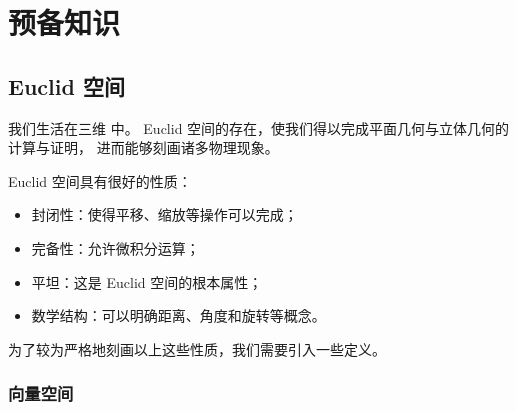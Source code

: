 \chapter{预备知识}

\section{Euclid 空间}

我们生活在三维 中。
Euclid 空间的存在，使我们得以完成平面几何与立体几何的计算与证明，
进而能够刻画诸多物理现象。

Euclid 空间具有很好的性质：
\begin{itemize}
  \item 封闭性：使得平移、缩放等操作可以完成；
  \item 完备性：允许微积分运算；
  \item 平坦：这是 Euclid 空间的根本属性；
  \item 数学结构：可以明确距离、角度和旋转等概念。
\end{itemize}

为了较为严格地刻画以上这些性质，我们需要引入一些定义。

\subsection{向量空间}


